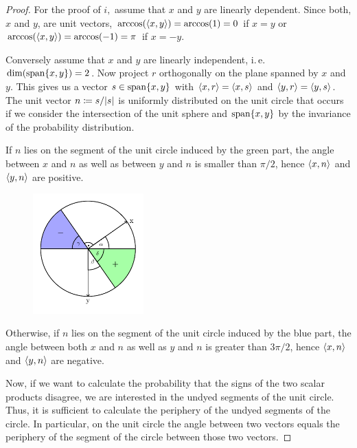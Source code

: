 	\begin{proof}
		For the proof of $i,$ assume that $x$ and $y$ are linearly dependent. Since both, $x$ and $y$, are unit vectors, $\arccos(\langle{x},{y}\rangle) = \arccos(1)=0$ if $x=y$ or $\arccos(\langle{x},{y}\rangle) = \arccos(-1) = \pi$ if $x=-y$.
		
		Conversely assume that $x$ and $y$ are linearly independent, i.\,e. $\operatorname{dim}(\operatorname{span}\{x,y\})=2$. Now project $r$ orthogonally on the plane spanned by $x$ and $y$. This gives us a vector $s\in \operatorname{span}\{x,y\}$ with $\langle{x},{r}\rangle = \langle{x},{s}\rangle$ and $\langle{y},{r}\rangle = \langle{y},{s}\rangle$. The unit vector $n\coloneqq s/{\left|{s}\right|}$ is uniformly distributed on the unit circle that occurs if we consider the intersection of the unit sphere and $\operatorname{span}\{x,y\}$ by the invariance of the probability distribution. \\
		
		\noindent\begin{minipage}{\textwidth}	
			If $n$ lies on the segment of the unit circle induced by the green part, the angle between $x$ and $n$ as well as between $y$ and $n$ is smaller than $\pi/2$, hence $\langle{x},{n}\rangle$ and $\langle{y},{n}\rangle$ are positive. 
			\begin{figure}
				\vspace{-20pt}
				\begin{center}
					\includegraphics[width=0.38\textwidth]{chapters/fig_unit_circle.pdf}
				\end{center}
				\vspace{-20pt}
			\end{figure}
			Otherwise, if $n$ lies on the segment of the unit circle induced by the blue part, the angle between both $x$ and $n$ as well as $y$ and $n$ is greater than $3\pi/2$, hence $\langle{x},{n}\rangle$ and $\langle{y},{n}\rangle$ are negative.
			
			\hspace{12pt} Now, if we want to calculate the probability that the signs of the two scalar products disagree, we are interested in the undyed segments of the unit circle. Thus, it is sufficient to calculate the periphery of the undyed segments of the circle. In particular, on the unit circle the angle between two vectors equals the periphery of the segment of the circle between those two vectors. 
				

\end{minipage}
\end{proof}
